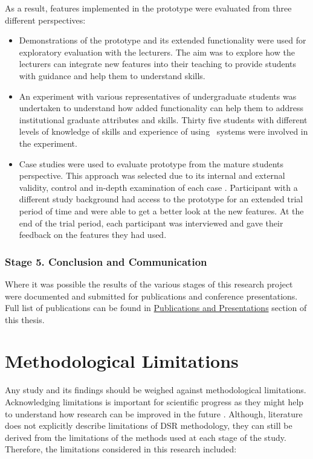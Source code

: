 As a result, features implemented in the prototype were evaluated from three
different perspectives: 

\begin{itemize}
  \item Demonstrations of the prototype and its extended functionality were used
  for exploratory evaluation with the lecturers. The aim was to explore how the
  lecturers can integrate new features into their teaching to provide students
  with guidance and help them to understand \LLLs skills.
  
  \item An experiment with various representatives of undergraduate students
  was undertaken to understand how added functionality can help them to address
  institutional graduate attributes and \LLLs skills. Thirty five students with
  different levels of knowledge of \LLLs skills and experience of using
  \ep~systems were involved in the experiment.

  \item Case studies were used to evaluate prototype from the mature students
  perspective. This approach was selected due to its internal and external
  validity, control and in-depth examination of each case \citep{Yin2009}.
  Participant with a different study background had access to the prototype for
  an extended trial period of time and were able to get a better look at the new
  features. At the end of the trial period, each participant was interviewed and
  gave their feedback on the features they had used.
\end{itemize}

\subsubsection{Stage 5. Conclusion and Communication}

Where it was possible the results of the various stages of this research project
were documented and submitted for publications and conference presentations. Full
list of publications can be found in \hyperref[sec:pub]{Publications and
Presentations} section of this thesis.

\section{Methodological Limitations}
\label{sec:limits}

Any study and its findings should be weighed against methodological
limitations. Acknowledging limitations is important for scientific progress as
they might help to understand how research can be improved in the future
\citep{Ioannidis2007}. Although, literature does not explicitly describe
limitations of DSR methodology, they can still be derived from the limitations
of the methods used at each stage of the study. Therefore, the limitations
considered in this research included:

